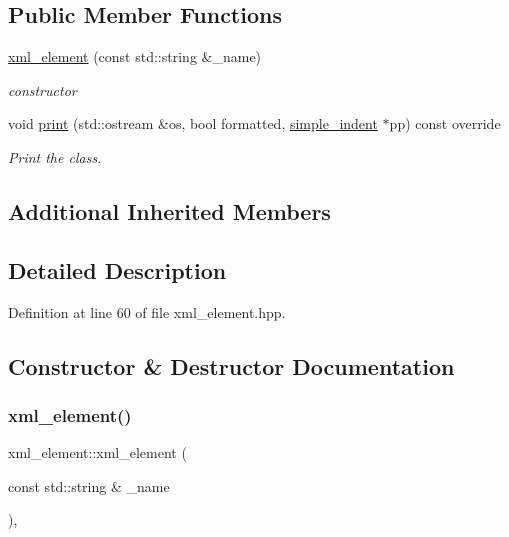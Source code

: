 \subsection*{Public Member Functions}
\begin{DoxyCompactItemize}
\item 
\hyperlink{classxml__element_abeb16028a7a37da8c6a4c9309578bf1a}{xml\+\_\+element} (const std\+::string \&\+\_\+name)
\begin{DoxyCompactList}\small\item\em constructor \end{DoxyCompactList}\item 
void \hyperlink{classxml__element_ac2a5c89bcbbfee04039fe93824489677}{print} (std\+::ostream \&os, bool formatted, \hyperlink{classsimple__indent}{simple\+\_\+indent} $\ast$pp) const override
\begin{DoxyCompactList}\small\item\em Print the class. \end{DoxyCompactList}\end{DoxyCompactItemize}
\subsection*{Additional Inherited Members}


\subsection{Detailed Description}


Definition at line 60 of file xml\+\_\+element.\+hpp.



\subsection{Constructor \& Destructor Documentation}
\mbox{\label{classxml__element_abeb16028a7a37da8c6a4c9309578bf1a}} 
\subsubsection{\texorpdfstring{xml\+\_\+element()}{xml\_element()}}
{\footnotesize\ttfamily xml\+\_\+element\+::xml\+\_\+element (\begin{DoxyParamCaption}\item[{const std\+::string \&}]{\+\_\+name }\end{DoxyParamCaption})\hspace{0.3cm}{\ttfamily [inline]}, {\ttfamily [explicit]}}



